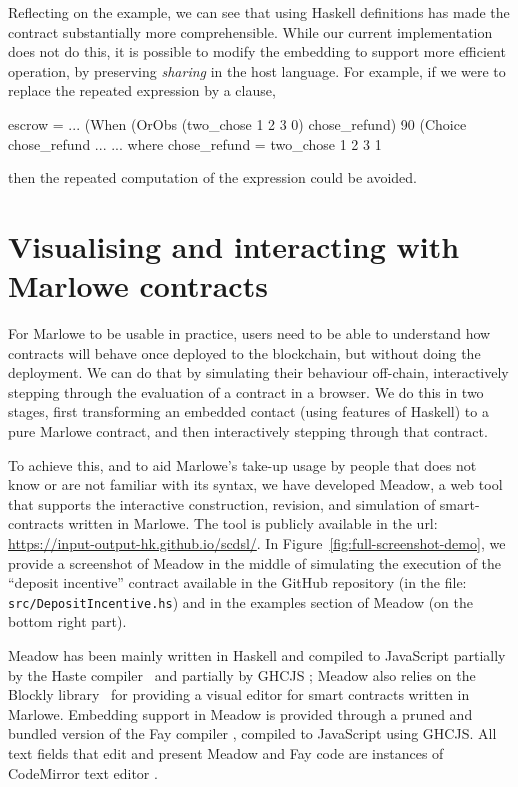 \documentclass[runningheads]{llncs}
\begin{document}
Reflecting on the example, we can see that using Haskell definitions has made the contract substantially more 
comprehensible. While our current implementation does not do this, it is possible to modify the embedding to support 
more efficient operation, by preserving \emph{sharing} in the host language. For example, if we were to replace the 
repeated  expression 
 by a  clause, 
\begin{haskellcode}
escrow = ...        (When (OrObs (two_chose 1 2 3 0)
                                 chose_refund)
                          90
                          (Choice chose_refund ...
                           ...
         where chose_refund = two_chose 1 2 3 1                 
\end{haskellcode}
then the repeated computation of the expression could be avoided.

\section{Visualising and interacting with Marlowe contracts}

\label{section:tool}

For Marlowe to be usable in practice, users need to be able to understand how contracts will behave once deployed to 
the blockchain, but without doing the deployment. We can do that by simulating their behaviour off-chain, interactively 
stepping through the evaluation of a contract in a browser. We do this in two stages, first transforming an embedded 
contact (using features of Haskell) to a pure Marlowe contract, and then interactively stepping through that contract.

To achieve this, and to aid Marlowe's take-up
usage by people that does not know or are not familiar with its syntax,
we have developed Meadow, a web tool that supports the interactive construction,
revision, and simulation of smart-contracts written in Marlowe. The
tool is publicly available in the url: \url{https://input-output-hk.github.io/scdsl/}.
In Figure~\ref{fig:full-screenshot-demo}, we provide a screenshot
of Meadow in the middle of simulating the execution of the ``deposit incentive'' contract available
in the GitHub repository (in the file: \texttt{src/DepositIncentive.hs}) and in the examples section of Meadow (on the 
bottom right part).

Meadow has been mainly written in Haskell and compiled to JavaScript
partially by the Haste compiler~\cite{Haste} and partially by GHCJS \cite{GHCJS};
Meadow also relies on the Blockly library~\cite{Blockly} for providing a visual
editor for smart contracts written in Marlowe. Embedding support in Meadow
is provided through a pruned and bundled version of the Fay compiler \cite{Fay},
compiled to JavaScript using GHCJS. All text fields that edit and present Meadow and Fay code are
instances of CodeMirror text editor \cite{CodeMirror}.
\end{document}
